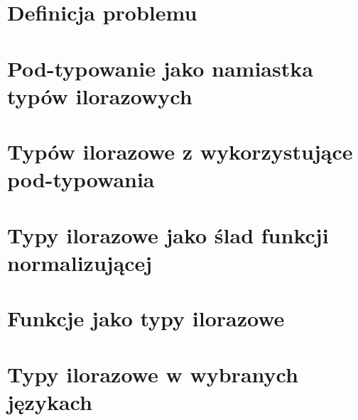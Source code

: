 \documentclass[shortabstract, mgr]{iithesis}
\author         {Marek Bauer}
\begin{document}

    \chapter{Definicja problemu}
	
	
	\chapter{Pod-typowanie jako namiastka typów ilorazowych}
	

    \chapter{Typów ilorazowe z wykorzystujące pod-typowania}
	

    \chapter{Typy ilorazowe jako ślad funkcji normalizującej}
	

    \chapter{Funkcje jako typy ilorazowe}
	

    \chapter{Typy ilorazowe w wybranych językach}
	

	
	
\end{document}
